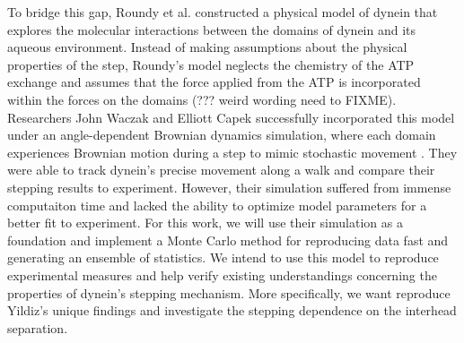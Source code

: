 To bridge this gap, Roundy et al. constructed a physical model of dynein that explores the molecular interactions between the domains of dynein and its aqueous environment. Instead of making assumptions about the physical properties of the step, Roundy's model neglects the chemistry of the ATP exchange and assumes that the force applied from the ATP is incorporated within the forces on the domains (??? weird wording need to FIXME). Researchers John Waczak and Elliott Capek successfully incorporated this model under an angle-dependent Brownian dynamics simulation, where each domain experiences Brownian motion during a step to mimic stochastic movement \cite{Capek2017, Burgess2003}. They were able to track dynein's precise movement along a walk and compare their stepping results to experiment. However, their simulation suffered from immense computaiton time and lacked the ability to optimize model parameters for a better fit to experiment. For this work, we will use their simulation as a foundation and implement a Monte Carlo method for reproducing data fast and generating an ensemble of statistics. We intend to use this model to reproduce experimental measures and help verify existing understandings concerning the properties of dynein’s stepping mechanism. More specifically, we want reproduce Yildiz's unique findings and investigate the stepping dependence on the interhead separation. 



